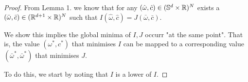 \documentclass[twoside]{article}
\begin{document}
    \begin{proof}
        From Lemma 1. we know that for any $(\hat{\omega}, \hat{c}) \in (\mathbb{S}^{d} \times \mathbb{R})^{N}$
        exists a $(\bar{\omega}, \bar{c}) \in (\mathbb{R}^{d+1} \times \mathbb{R})^{N}$ such that
        $I(\hat{\omega}, \hat{c}) = J(\bar{\omega}, \bar{c})$.

        We show this implies the global minima of $I, J$ occurr "at the same point".
        That is, the value $(\omega^{*}, c^{*})$ that minimises $I$ can be mapped to a 
        corresponding value $(\bar{\omega}^{*}, \bar{\omega}^{*})$ that minimises $J$.

        To do this, we start by noting that $I$ is a lower of $I$.

    \end{proof}
    
\end{document}
